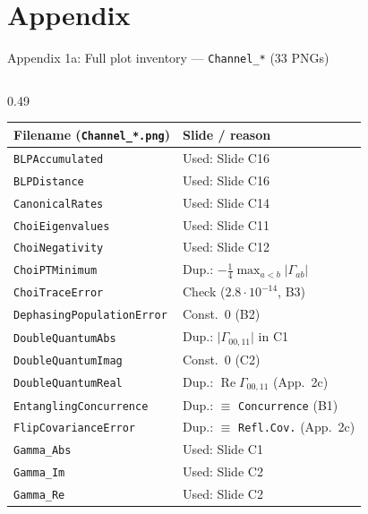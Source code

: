 \documentclass[aspectratio=169,11pt]{beamer}
\begin{document}
\begin{frame}[plain]
\end{frame}

\appendix
\section{Appendix}

\begin{frame}{Appendix 1a: Full plot inventory --- \texttt{Channel\_*} ($33$ PNGs)}
\scriptsize\setlength{\tabcolsep}{3pt}
\begin{columns}[T,totalwidth=\textwidth]
\begin{column}{0.49\textwidth}
\begin{tabular}{@{}ll@{}}
\toprule
Filename (\texttt{Channel\_*.png}) & Slide / reason \\\midrule
\texttt{BLPAccumulated} & Used: Slide C16 \\
\texttt{BLPDistance} & Used: Slide C16 \\
\texttt{CanonicalRates} & Used: Slide C14 \\
\texttt{ChoiEigenvalues} & Used: Slide C11 \\
\texttt{ChoiNegativity} & Used: Slide C12 \\
\texttt{ChoiPTMinimum} & Dup.: $-\frac14\max_{a<b}\lvert\Gamma_{ab}\rvert$ \\
\texttt{ChoiTraceError} & Check ($2.8\cdot 10^{-14}$, B3) \\
\texttt{DephasingPopulationError} & Const.\ $0$ (B2) \\
\texttt{DoubleQuantumAbs} & Dup.: $\lvert\Gamma_{00,11}\rvert$ in C1 \\
\texttt{DoubleQuantumImag} & Const.\ $0$ (C2) \\
\texttt{DoubleQuantumReal} & Dup.: $\operatorname{Re}\Gamma_{00,11}$ (App.\ 2c) \\
\texttt{EntanglingConcurrence} & Dup.: $\equiv$ \texttt{Concurrence} (B1) \\
\texttt{FlipCovarianceError} & Dup.: $\equiv$ \texttt{Refl.Cov.} (App.\ 2c) \\
\texttt{Gamma\_Abs} & Used: Slide C1 \\
\texttt{Gamma\_Im} & Used: Slide C2 \\
\texttt{Gamma\_Re} & Used: Slide C2 \\

\end{tabular}
\end{column}
\end{columns}
\end{frame}
\end{document}

